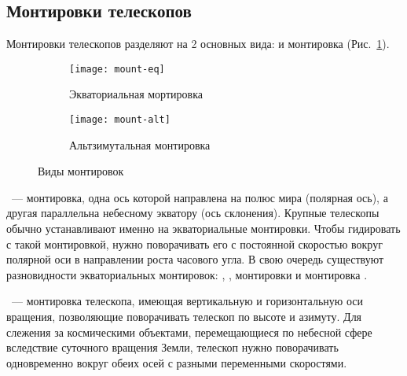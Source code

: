\subsection{Монтировки телескопов}
Монтировки телескопов разделяют на 2 основных вида:  и  монтировка (Рис.~\ref{mounts}).
\begin{figure}[h]
	\centering
	\hspace*{.4cm}
	\begin{subfigure}{0.48\textwidth}
		\texttt{[image: mount-eq]}
		\caption{Экваториальная мортировка}
	 \end{subfigure}
	\hspace*{.4cm}
	\begin{subfigure}{0.41\textwidth}
		\texttt{[image: mount-alt]}
		\caption{Альтзимутальная монтировка}
	 \end{subfigure}
	 \hspace*{.4cm}
	 \caption{Виды монтировок}
	 \label{mounts}
\end{figure}

~--- монтировка, одна ось которой направлена на полюс мира (полярная ось), а другая параллельна небесному экватору (ось склонения). Крупные телескопы обычно устанавливают именно на экваториальные монтировки. Чтобы гидировать с такой монтировкой, нужно поворачивать его с постоянной скоростью вокруг полярной оси в направлении роста часового угла. В свою очередь существуют разновидности экваториальных монтировок: , ,  монтировки и монтировка .

~--- монтировка телескопа, имеющая вертикальную и горизонтальную оси вращения, позволяющие поворачивать телескоп по высоте и азимуту. Для слежения за космическими объектами, перемещающиеся по небесной сфере вследствие суточного вращения Земли, телескоп нужно поворачивать одновременно вокруг обеих осей с разными переменными скоростями.